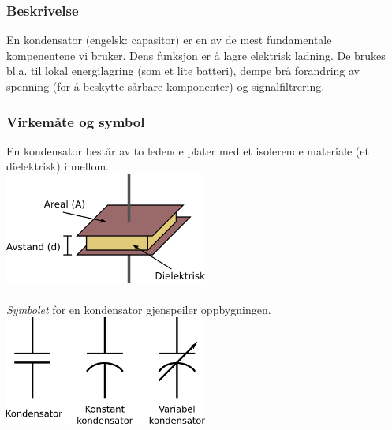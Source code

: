 \subsubsection{Beskrivelse}
En kondensator (engelsk: capasitor)
er en av de mest fundamentale kompenentene vi bruker.
Dens funksjon er å lagre elektrisk ladning.
De brukes bl.a. til lokal energilagring (som et lite batteri),
dempe brå forandring av spenning (for å beskytte sårbare komponenter)
og signalfiltrering.



\subsubsection{Virkemåte og symbol}
En kondensator består av to ledende plater
med et isolerende materiale (et dielektrisk) i mellom.
\\
\includegraphics[width=0.5\textwidth]{./img/kondensator-basic}
\\\\
\emph{Symbolet} for en kondensator gjenspeiler oppbygningen.
\\
\includegraphics[width=0.5\textwidth]{./img/kondensator-symboler}
\\

